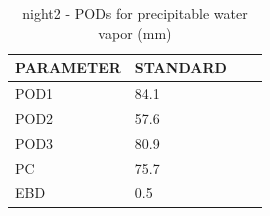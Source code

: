 \begin{table}[p!]
\begin{center}
\begin{tabular}{|l|l|l|l|}
\hline
\multicolumn{1}{|c|}{\cellcolor[HTML]{C0C0C0}\textbf{PARAMETER}} & \multicolumn{1}{c|}{\cellcolor[HTML]{C0C0C0}\textbf{STANDARD}} \\
\hline
\cellcolor[HTML]{C0C0C0}POD1  & 84.1                                \\
\cellcolor[HTML]{C0C0C0}POD2  & 57.6                                \\
\cellcolor[HTML]{C0C0C0}POD3  & 80.9                                \\
\cellcolor[HTML]{C0C0C0}PC    & 75.7                                  \\
\cellcolor[HTML]{C0C0C0}EBD   & 0.5                                 \\
\hline
\end{tabular}
\caption{night2 - PODs for precipitable water vapor (mm)}
\label{tab:podpwv:night2}
\end{center}
\end{table}
